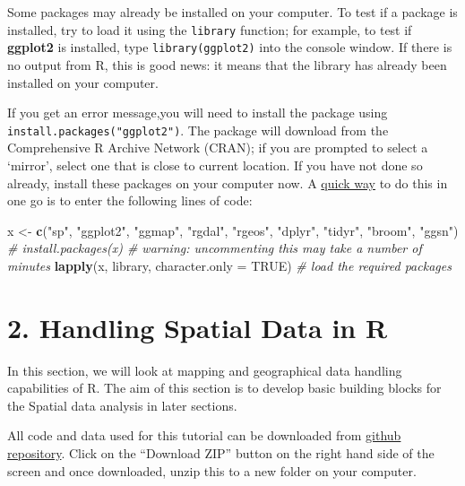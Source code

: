 \documentclass[]{article}
\newenvironment{Shaded}{}{}
\newcommand{\CommentTok}[1]{\textcolor[rgb]{0.38,0.63,0.69}{\textit{#1}}}
\newcommand{\DataTypeTok}[1]{\textcolor[rgb]{0.56,0.13,0.00}{#1}}
\newcommand{\KeywordTok}[1]{\textcolor[rgb]{0.00,0.44,0.13}{\textbf{#1}}}
\newcommand{\NormalTok}[1]{#1}
\newcommand{\OtherTok}[1]{\textcolor[rgb]{0.00,0.44,0.13}{#1}}
\newcommand{\StringTok}[1]{\textcolor[rgb]{0.25,0.44,0.63}{#1}}
\begin{document}
Some packages may already be installed on your computer. To test if a
package is installed, try to load it using the \texttt{library}
function; for example, to test if \textbf{ggplot2} is installed, type
\texttt{library(ggplot2)} into the console window. If there is no output
from R, this is good news: it means that the library has already been
installed on your computer.

If you get an error message,you will need to install the package using
\texttt{install.packages("ggplot2")}. The package will download from the
Comprehensive R Archive Network (CRAN); if you are prompted to select a
`mirror', select one that is close to current location. If you have not
done so already, install these packages on your computer now. A
\href{http://stackoverflow.com/questions/8175912/load-multiple-packages-at-once}{quick
way} to do this in one go is to enter the following lines of code:

\begin{Shaded}
\begin{Highlighting}[]
\NormalTok{x <-}\StringTok{ }\KeywordTok{c}\NormalTok{(}\StringTok{"sp"}\NormalTok{, }\StringTok{"ggplot2"}\NormalTok{, }\StringTok{"ggmap"}\NormalTok{, }\StringTok{"rgdal"}\NormalTok{, }\StringTok{"rgeos"}\NormalTok{, }\StringTok{"dplyr"}\NormalTok{, }\StringTok{"tidyr"}\NormalTok{, }\StringTok{"broom"}\NormalTok{, }\StringTok{"ggsn"}\NormalTok{) }
\CommentTok{# install.packages(x) # warning: uncommenting this may take a number of minutes}
\KeywordTok{lapply}\NormalTok{(x, library, }\DataTypeTok{character.only =} \OtherTok{TRUE}\NormalTok{) }\CommentTok{# load the required packages}
\end{Highlighting}
\end{Shaded}

\hypertarget{handling-spatial-data-in-r}{%
\section{2. Handling Spatial Data in
R}\label{handling-spatial-data-in-r}}

In this section, we will look at mapping and geographical data handling
capabilities of R. The aim of this section is to develop basic building
blocks for the Spatial data analysis in later sections.

All code and data used for this tutorial can be downloaded from
\href{https://github.com/rajwanimayur/SpatialAnalysisInR}{github
repository}. Click on the ``Download ZIP'' button on the right hand side
of the screen and once downloaded, unzip this to a new folder on your
computer.
\end{document}
